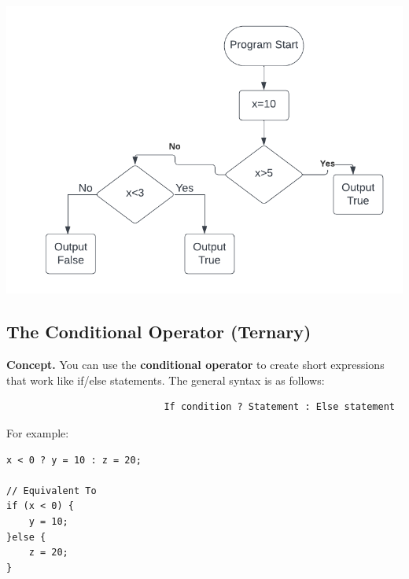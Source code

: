 \documentclass{report}
\begin{document}
    \begin{minipage}[]{0.3\textwidth}
        \begin{center}
            \includegraphics[scale=0.5]{./figures/flowchart3.png}
        \end{center} 
    \end{minipage}


    \bigbreak \noindent 
    \subsection{The Conditional Operator (Ternary)} 
    \bigbreak \noindent 
    \textbf{Concept.} You can use the \textbf{conditional operator} to create short expressions that work like if/else statements. The general syntax is as follows:
    \smallbreak \noindent
    \sepline
    \begin{verbatim}
                            If condition ? Statement : Else statement
    \end{verbatim}
    \sepline
    \bigbreak \noindent 
    For example:
    \smallbreak \noindent
    \sepline
    \begin{verbatim}
x < 0 ? y = 10 : z = 20; 

// Equivalent To
if (x < 0) {
    y = 10;
}else {
    z = 20;
}
    \end{verbatim}
    \sepline

    \pagebreak \bigbreak \noindent 
\end{document}
